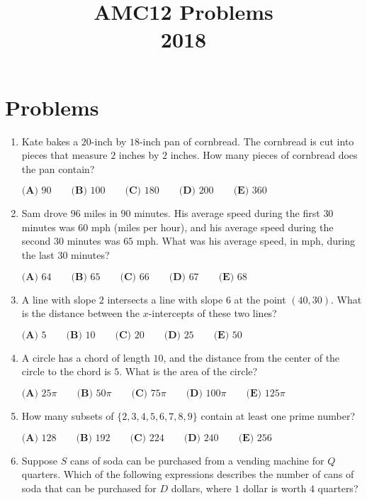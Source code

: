 \documentclass{article}
\title{AMC12 Problems \\ 2018}
\date{}
\begin{document}
\maketitle\thispagestyle{fancy}\newpage\section*{Problems}\begin{enumerate}[label=\arabic*., itemsep=0.5em]\item Kate bakes a $20$-inch by $18$-inch pan of cornbread. The cornbread is cut into pieces that measure $2$ inches by $2$ inches. How many pieces of cornbread does the pan contain?

$\textbf{(A) } 90 \qquad \textbf{(B) } 100 \qquad \textbf{(C) } 180 \qquad \textbf{(D) } 200 \qquad \textbf{(E) } 360$\par \vspace{0.5em}\item Sam drove $96$ miles in $90$ minutes. His average speed during the first $30$ minutes was $60$ mph (miles per hour), and his average speed during the second $30$ minutes was $65$ mph. What was his average speed, in mph, during the last $30$ minutes?

$
\textbf{(A) } 64 \qquad
\textbf{(B) } 65 \qquad
\textbf{(C) } 66 \qquad
\textbf{(D) } 67 \qquad
\textbf{(E) } 68
$\par \vspace{0.5em}\item A line with slope $2$ intersects a line with slope $6$ at the point $(40,30)$. What is the distance between the $x$-intercepts of these two lines? 

$\textbf{(A) } 5 \qquad \textbf{(B) } 10 \qquad \textbf{(C) } 20 \qquad \textbf{(D) } 25 \qquad \textbf{(E) } 50$\par \vspace{0.5em}\item A circle has a chord of length $10$, and the distance from the center of the circle to the chord is $5$. What is the area of the circle?

$
\textbf{(A) }25\pi \qquad
\textbf{(B) }50\pi \qquad
\textbf{(C) }75\pi \qquad
\textbf{(D) }100\pi \qquad
\textbf{(E) }125\pi \qquad
$\par \vspace{0.5em}\item How many subsets of $\{2,3,4,5,6,7,8,9\}$ contain at least one prime number?

$
\textbf{(A) } 128 \qquad
\textbf{(B) } 192 \qquad
\textbf{(C) } 224 \qquad
\textbf{(D) } 240 \qquad
\textbf{(E) } 256
$\par \vspace{0.5em}\item Suppose $S$ cans of soda can be purchased from a vending machine for $Q$ quarters. Which of the following expressions describes the number of cans of soda that can be purchased for $D$ dollars, where $1$ dollar is worth $4$ quarters?


\end{enumerate}
\end{document}
